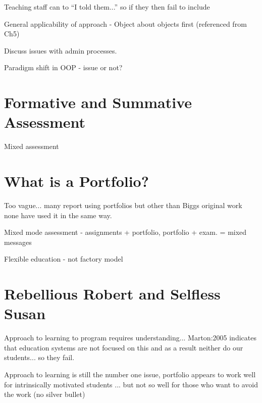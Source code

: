 Teaching staff can to  ``I told them...'' so if they then fail to include 









General applicability of approach - Object about objects first (referenced from Ch5)

Discuss issues with admin processes.

Paradigm shift in OOP
- issue or not?

\section{Formative and Summative Assessment} %
\label{sec:formative_and_summative_assessment}

Mixed assessment


\section{What is a Portfolio?} %
\label{sec:what_is_a_portfolio_}

Too vague... many report using portfolios but other than Biggs original work none have used it in the same way.


Mixed mode assessment - assignments + portfolio, portfolio + exam.
= mixed messages

Flexible education
- not factory model



\section{Rebellious Robert and Selfless Susan} %
\label{sec:rebellious_robert_and_selfless_susan}

Approach to learning to program requires understanding... Marton:2005 indicates that education systems are not focused on this and as a result neither do our students... so they fail.

Approach to learning is still the number one issue, portfolio appears to work well for intrinsically motivated students ... but not so well for those who want to avoid the work (no silver bullet)

